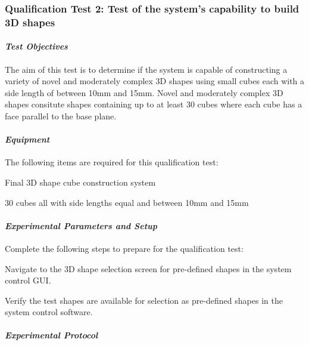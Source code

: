 \subsubsection*{Qualification Test 2: Test of the system's capability to build 3D shapes}

\paragraph{\textit{Test Objectives}}

The aim of this test is to determine if the system is capable of constructing a variety of novel and moderately complex 3D shapes using small cubes each with a side length of between 10mm and 15mm. Novel and moderately complex 3D shapes consitute shapes containing up to at least 30 cubes where each cube has a face parallel to the base plane.

\paragraph{\textit{Equipment}} 

The following items are required for this qualification test:

\begin{compactitem}
    \item Final 3D shape cube construction system
    \item 30 cubes all with side lengths equal and between 10mm and 15mm
\end{compactitem}

\paragraph{\textit{Experimental Parameters and Setup}}

Complete the following steps to prepare for the qualification test:

\begin{compactenum}
    \item Navigate to the 3D shape selection screen for pre-defined shapes in the system control GUI.
    \item Verify the test shapes are available for selection as pre-defined shapes in the system control software.
\end{compactenum}

\paragraph{\textit{Experimental Protocol}}

